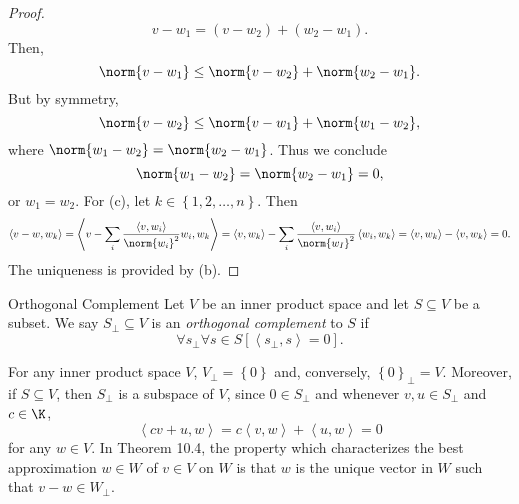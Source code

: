 \documentclass[linearalgebra]{subfiles}
\begin{document}
\begin{proof}
        \begin{equation*}
            v-w_1 = \left( v-w_2 \right) + \left( w_2-w_1 \right) .
        \end{equation*}
        Then,
        \begin{equation*}
            \norm{v-w_1} \leq \norm{v-w_2} + \norm{w_2-w_1}.
        \end{equation*}
        But by symmetry,
        \begin{equation*}
            \norm{v-w_2} \leq \norm{v-w_1} + \norm{w_1-w_2},
        \end{equation*}
        where $\norm{w_1-w_2} = \norm{w_2-w_1}$. Thus we conclude
        \begin{equation*}
            \norm{w_1-w_2} = \norm{w_2-w_1} = 0,
        \end{equation*}
        or $w_1=w_2$. For (c), let $k\in \left\lbrace 1,2,\ldots,n \right\rbrace$. Then
        \begin{equation*}
            \left\langle v-w, w_k\right\rangle = \left\langle v-\sum^{}_{i} \frac{\left\langle v, w_i\right\rangle }{\norm{w_i}^2}w_i, w_k\right\rangle = \left\langle v, w_k\right\rangle - \sum^{}_{i} \frac{\left\langle v, w_i\right\rangle }{\norm{w_I}^2}\left\langle w_i, w_k\right\rangle = \left\langle v, w_k\right\rangle - \left\langle v, w_k\right\rangle = 0.
        \end{equation*}
        The uniqueness is provided by (b).
    \end{proof}

    \begin{definition}{Orthogonal Complement}{}
        Let $V$ be an inner product space and let $S\subseteq V$ be a subset. We say $S_\perp\subseteq V$ is an \emph{orthogonal complement} to $S$ if
        \begin{equation*}
            \forall s_\perp\forall s\in S \left[ \left\langle s_\perp, s\right\rangle =0 \right] .
        \end{equation*}
    \end{definition}

    \begin{remark}
        For any inner product space $V$, $V_\perp = \left\lbrace 0 \right\rbrace$ and, conversely, $\left\lbrace 0 \right\rbrace _\perp = V$. Moreover, if $S\subseteq V$, then $S_\perp$ is a subspace of $V$, since $0\in S_\perp$ and whenever $v,u\in S_\perp$ and $c\in\K$,
        \begin{equation*}
            \left\langle cv+u, w\right\rangle = c\left\langle v, w\right\rangle + \left\langle u, w\right\rangle = 0
        \end{equation*}
        for any $w\in V$. In Theorem 10.4, the property which characterizes the best approximation $w\in W$ of $v\in V$ on $W$ is that $w$ is the unique vector in $W$ such that $v-w\in W_\perp$.
    \end{remark}
\end{document}
